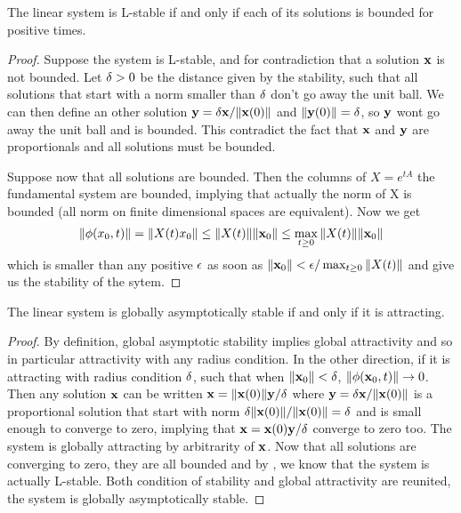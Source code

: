  \begin{theoreme} \label{th:stablecondition}
     The linear system is L-stable if and only if each of its solutions is bounded for positive times.
 \end{theoreme}
 \begin{proof}
  Suppose the system is L-stable, and for contradiction that a solution $\mathbf{x}$ is not bounded. Let $\delta>0$ be the distance given by the stability, such that all solutions that start with a norm smaller than $\delta$ don't go away the unit ball. We can then define an other solution $\mathbf{y}=\delta\mathbf{x}/\|\mathbf{x}(0)\|$ and $\|\mathbf{y}(0)\|=\delta$, so $\mathbf{y}$ wont go away the unit ball and is bounded. This contradict the fact that $\mathbf{x}$ and $\mathbf{y}$ are proportionals and all solutions must be bounded.
  
  Suppose now that all solutions are bounded. Then the columns of $X=e^{tA}$ the fundamental system are bounded, implying that actually the norm of X is bounded (all norm on finite dimensional spaces are equivalent). Now we get 
  \[ \|\phi(x_0,t)\|=\|X(t)x_0\| 
  \leq \|X(t)\| \|\mathbf{x}_0\| 
  \leq \max_{t\geq0} \|X(t)\| \|\mathbf{x}_0\| \]
  which is smaller than any positive $\epsilon$ as soon as $\|\mathbf{x}_0\|<\epsilon/\max_{t\geq0} \|X(t)\|$ and give us the stability of the sytem.
 \end{proof}
\begin{theoreme}
    The linear system is globally asymptotically stable if and only if it is attracting.
\end{theoreme}
\begin{proof}
By definition, global asymptotic stability implies global attractivity and so in particular attractivity with any radius condition. In the other direction, if it is attracting with radius condition $\delta$, such that when $\|\mathbf{x}_0\|<\delta$, $\|\phi(\mathbf{x}_0,t)\|\to0$. Then any solution $\mathbf{x}$ can be written $\mathbf{x}=\|\mathbf{x}(0)\|\mathbf{y}/\delta$ where $\mathbf{y}=\delta\mathbf{x}/\|\mathbf{x}(0)\|$ is a proportional solution that start with norm $\delta\|\mathbf{x}(0)\|/\|\mathbf{x}(0)\|=\delta$ and is small enough to converge to zero, implying that $\mathbf{x}=\mathbf{x}(0)\mathbf{y}/\delta$ converge to zero too. The system is globally attracting by arbitrarity of $\mathbf{x}$. Now that all solutions are converging to zero, they are all bounded and by , we know that the system is actually L-stable. Both condition of stability and global attractivity are reunited, the system is globally asymptotically stable.
\end{proof}

